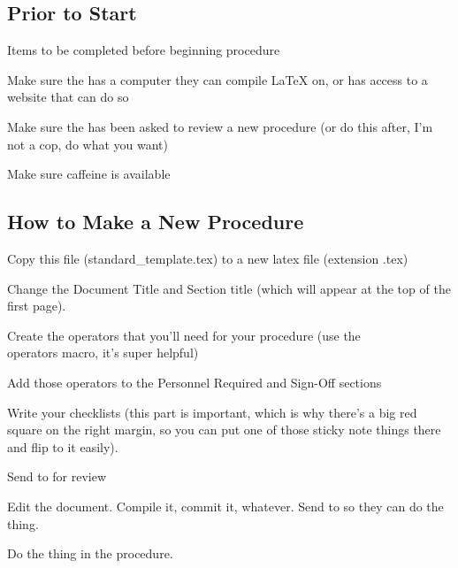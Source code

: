 \subsection{Prior to Start}
\begin{checklist}
    \item Items to be completed before beginning procedure
    \begin{checklist}
        \item Make sure the \auth{} has a computer they can compile \LaTeX{} on, or has access to a website that can do so
        \item Make sure the \edi{} has been asked to review a new procedure (or do this after, I'm not a cop, do what you want)
        \item Make sure caffeine is available
    \end{checklist}
\end{checklist}
\setcounter{checklistnum}{0}

\newpage
\subsection{How to Make a New Procedure}
\begin{checklist}
    \item \auth{} Copy this file (standard\_template.tex) to a new latex file (extension .tex)
    \item \auth{} Change the Document Title and Section title (which will appear at the top of the first page).
    \item \auth{} Create the operators that you'll need for your procedure (use the \\operators macro, it's super helpful)
    \item \auth{} Add those operators to the Personnel Required and Sign-Off sections
    \item \auth{} Write your checklists (this part is important, which is why there's a big red square on the right margin, so you can put one of those sticky note things there and flip to it easily). 
    \item \auth{} Send to \edi{} for review
    \item \edi{} Edit the document. Compile it, commit it, whatever. Send to \perf{} so they can do the thing.
    \item \perf{} Do the thing in the procedure.
\end{checklist}
\setcounter{checklistnum}{0}

